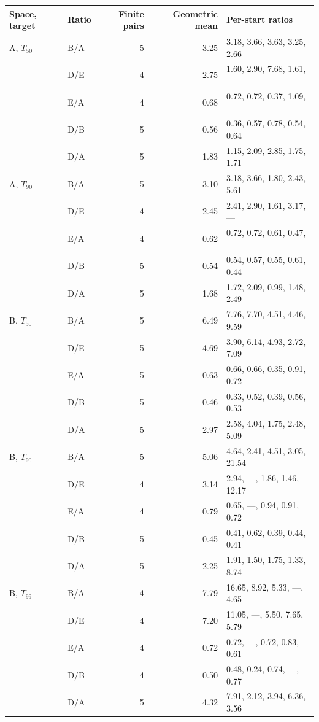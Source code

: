 \begin{tabular}{llrrl}\toprule
Space, target & Ratio & Finite pairs & Geometric mean & Per-start ratios\\\midrule
A, $T_{50}$ & B/A & 5 & 3.25 & 3.18, 3.66, 3.63, 3.25, 2.66\\
 & D/E & 4 & 2.75 & 1.60, 2.90, 7.68, 1.61, ---\\
 & E/A & 4 & 0.68 & 0.72, 0.72, 0.37, 1.09, ---\\
 & D/B & 5 & 0.56 & 0.36, 0.57, 0.78, 0.54, 0.64\\
 & D/A & 5 & 1.83 & 1.15, 2.09, 2.85, 1.75, 1.71\\
\addlinespace
A, $T_{90}$ & B/A & 5 & 3.10 & 3.18, 3.66, 1.80, 2.43, 5.61\\
 & D/E & 4 & 2.45 & 2.41, 2.90, 1.61, 3.17, ---\\
 & E/A & 4 & 0.62 & 0.72, 0.72, 0.61, 0.47, ---\\
 & D/B & 5 & 0.54 & 0.54, 0.57, 0.55, 0.61, 0.44\\
 & D/A & 5 & 1.68 & 1.72, 2.09, 0.99, 1.48, 2.49\\
\addlinespace
B, $T_{50}$ & B/A & 5 & 6.49 & 7.76, 7.70, 4.51, 4.46, 9.59\\
 & D/E & 5 & 4.69 & 3.90, 6.14, 4.93, 2.72, 7.09\\
 & E/A & 5 & 0.63 & 0.66, 0.66, 0.35, 0.91, 0.72\\
 & D/B & 5 & 0.46 & 0.33, 0.52, 0.39, 0.56, 0.53\\
 & D/A & 5 & 2.97 & 2.58, 4.04, 1.75, 2.48, 5.09\\
\addlinespace
B, $T_{90}$ & B/A & 5 & 5.06 & 4.64, 2.41, 4.51, 3.05, 21.54\\
 & D/E & 4 & 3.14 & 2.94, ---, 1.86, 1.46, 12.17\\
 & E/A & 4 & 0.79 & 0.65, ---, 0.94, 0.91, 0.72\\
 & D/B & 5 & 0.45 & 0.41, 0.62, 0.39, 0.44, 0.41\\
 & D/A & 5 & 2.25 & 1.91, 1.50, 1.75, 1.33, 8.74\\
\addlinespace
B, $T_{99}$ & B/A & 4 & 7.79 & 16.65, 8.92, 5.33, ---, 4.65\\
 & D/E & 4 & 7.20 & 11.05, ---, 5.50, 7.65, 5.79\\
 & E/A & 4 & 0.72 & 0.72, ---, 0.72, 0.83, 0.61\\
 & D/B & 4 & 0.50 & 0.48, 0.24, 0.74, ---, 0.77\\
 & D/A & 5 & 4.32 & 7.91, 2.12, 3.94, 6.36, 3.56\\
\bottomrule\end{tabular}
